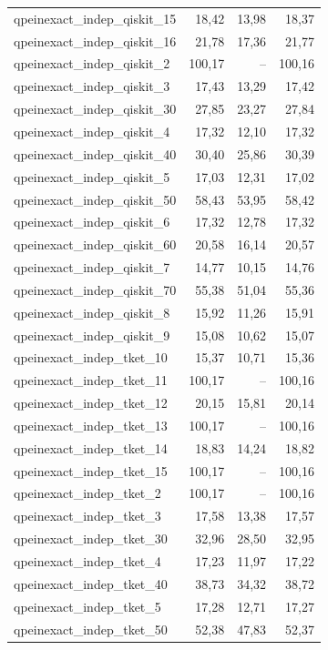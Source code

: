 \begin{longtable}{lrrr}
qpeinexact\_indep\_qiskit\_15 & 18,42 & 13,98 & 18,37 \\
qpeinexact\_indep\_qiskit\_16 & 21,78 & 17,36 & 21,77 \\
qpeinexact\_indep\_qiskit\_2 & 100,17 & -- & 100,16 \\
qpeinexact\_indep\_qiskit\_3 & 17,43 & 13,29 & 17,42 \\
qpeinexact\_indep\_qiskit\_30 & 27,85 & 23,27 & 27,84 \\
qpeinexact\_indep\_qiskit\_4 & 17,32 & 12,10 & 17,32 \\
qpeinexact\_indep\_qiskit\_40 & 30,40 & 25,86 & 30,39 \\
qpeinexact\_indep\_qiskit\_5 & 17,03 & 12,31 & 17,02 \\
qpeinexact\_indep\_qiskit\_50 & 58,43 & 53,95 & 58,42 \\
qpeinexact\_indep\_qiskit\_6 & 17,32 & 12,78 & 17,32 \\
qpeinexact\_indep\_qiskit\_60 & 20,58 & 16,14 & 20,57 \\
qpeinexact\_indep\_qiskit\_7 & 14,77 & 10,15 & 14,76 \\
qpeinexact\_indep\_qiskit\_70 & 55,38 & 51,04 & 55,36 \\
qpeinexact\_indep\_qiskit\_8 & 15,92 & 11,26 & 15,91 \\
qpeinexact\_indep\_qiskit\_9 & 15,08 & 10,62 & 15,07 \\
qpeinexact\_indep\_tket\_10 & 15,37 & 10,71 & 15,36 \\
qpeinexact\_indep\_tket\_11 & 100,17 & -- & 100,16 \\
qpeinexact\_indep\_tket\_12 & 20,15 & 15,81 & 20,14 \\
qpeinexact\_indep\_tket\_13 & 100,17 & -- & 100,16 \\
qpeinexact\_indep\_tket\_14 & 18,83 & 14,24 & 18,82 \\
qpeinexact\_indep\_tket\_15 & 100,17 & -- & 100,16 \\
qpeinexact\_indep\_tket\_2 & 100,17 & -- & 100,16 \\
qpeinexact\_indep\_tket\_3 & 17,58 & 13,38 & 17,57 \\
qpeinexact\_indep\_tket\_30 & 32,96 & 28,50 & 32,95 \\
qpeinexact\_indep\_tket\_4 & 17,23 & 11,97 & 17,22 \\
qpeinexact\_indep\_tket\_40 & 38,73 & 34,32 & 38,72 \\
qpeinexact\_indep\_tket\_5 & 17,28 & 12,71 & 17,27 \\
qpeinexact\_indep\_tket\_50 & 52,38 & 47,83 & 52,37 \\

\end{longtable}
